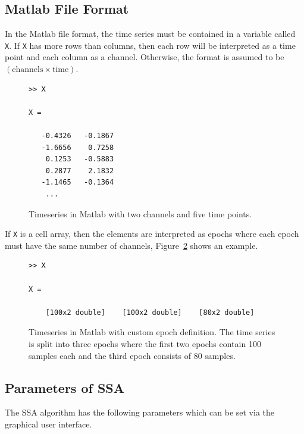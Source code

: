 \documentclass{article}
\newcommand{\1}{\ensuremath{\mathds{1}}}
\newcommand{\0}{\ensuremath{0}}
\begin{document}
\subsection{Matlab File Format}

In the Matlab file format, the time series must be contained in a variable
called \texttt{X}. If \texttt{X} has more rows than columns, then each row
will be interpreted as a time point and each column as a channel. Otherwise,
the format is assumed to be $(\text{channels} \times \text{time})$. 

\begin{figure}[h]
\centering
\begin{boxedminipage}{10cm}
\begin{verbatim}
>> X

X =

   -0.4326   -0.1867
   -1.6656    0.7258
    0.1253   -0.5883
    0.2877    2.1832
   -1.1465   -0.1364
    ...
\end{verbatim}
\end{boxedminipage}
\caption{Timeseries in Matlab with two channels and five time points.
\label{fig:ex_matlabts}
}
\end{figure}

If \texttt{X} is a cell array, then the elements
are interpreted as epochs where each epoch must have the same number 
of channels, Figure~\ref{fig:ex_matlabsegs} shows
an example.

\begin{figure}[h]
\centering
\begin{boxedminipage}{10cm}
\begin{verbatim}
>> X

X = 

    [100x2 double]    [100x2 double]    [80x2 double]
\end{verbatim}
\end{boxedminipage}
\caption{Timeseries in Matlab with custom epoch definition. The time series is split
into three epochs where the first two epochs contain 100 samples each and the third
epoch consists of 80 samples.
\label{fig:ex_matlabsegs}
}
\end{figure}

\FloatBarrier

\subsection{Parameters of SSA}
\label{sec:params}

The SSA algorithm has the following parameters which can be set via the graphical 
user interface.
\end{document}

